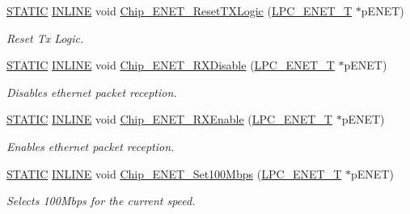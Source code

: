 \begin{DoxyCompactItemize}
\hyperlink{group__LPC__Types__Public__Macros_ga10b2d890d871e1489bb02b7e70d9bdfb}{S\+T\+A\+T\+IC} \hyperlink{group__LPC__Types__Public__Types_ga2eb6f9e0395b47b8d5e3eeae4fe0c116}{I\+N\+L\+I\+NE} void \hyperlink{group__ENET__17XX__40XX_ga23cc17a06ee9e42b4f1327cd792a2a8e}{Chip\+\_\+\+E\+N\+E\+T\+\_\+\+Reset\+T\+X\+Logic} (\hyperlink{structLPC__ENET__T}{L\+P\+C\+\_\+\+E\+N\+E\+T\+\_\+T} $\ast$p\+E\+N\+ET)
\begin{DoxyCompactList}\small\item\em Reset Tx Logic. \end{DoxyCompactList}\item 
\hyperlink{group__LPC__Types__Public__Macros_ga10b2d890d871e1489bb02b7e70d9bdfb}{S\+T\+A\+T\+IC} \hyperlink{group__LPC__Types__Public__Types_ga2eb6f9e0395b47b8d5e3eeae4fe0c116}{I\+N\+L\+I\+NE} void \hyperlink{group__ENET__17XX__40XX_gaef60a4790dcce43254081ea7fe5a22d4}{Chip\+\_\+\+E\+N\+E\+T\+\_\+\+R\+X\+Disable} (\hyperlink{structLPC__ENET__T}{L\+P\+C\+\_\+\+E\+N\+E\+T\+\_\+T} $\ast$p\+E\+N\+ET)
\begin{DoxyCompactList}\small\item\em Disables ethernet packet reception. \end{DoxyCompactList}\item 
\hyperlink{group__LPC__Types__Public__Macros_ga10b2d890d871e1489bb02b7e70d9bdfb}{S\+T\+A\+T\+IC} \hyperlink{group__LPC__Types__Public__Types_ga2eb6f9e0395b47b8d5e3eeae4fe0c116}{I\+N\+L\+I\+NE} void \hyperlink{group__ENET__17XX__40XX_gaccc601f3393807fe6255771fb1c47a0b}{Chip\+\_\+\+E\+N\+E\+T\+\_\+\+R\+X\+Enable} (\hyperlink{structLPC__ENET__T}{L\+P\+C\+\_\+\+E\+N\+E\+T\+\_\+T} $\ast$p\+E\+N\+ET)
\begin{DoxyCompactList}\small\item\em Enables ethernet packet reception. \end{DoxyCompactList}\item 
\hyperlink{group__LPC__Types__Public__Macros_ga10b2d890d871e1489bb02b7e70d9bdfb}{S\+T\+A\+T\+IC} \hyperlink{group__LPC__Types__Public__Types_ga2eb6f9e0395b47b8d5e3eeae4fe0c116}{I\+N\+L\+I\+NE} void \hyperlink{group__ENET__17XX__40XX_gad78db17fecab956142cb20d9a00e39e0}{Chip\+\_\+\+E\+N\+E\+T\+\_\+\+Set100\+Mbps} (\hyperlink{structLPC__ENET__T}{L\+P\+C\+\_\+\+E\+N\+E\+T\+\_\+T} $\ast$p\+E\+N\+ET)
\begin{DoxyCompactList}\small\item\em Selects 100\+Mbps for the current speed. \end{DoxyCompactList}\item 

\end{DoxyCompactItemize}

